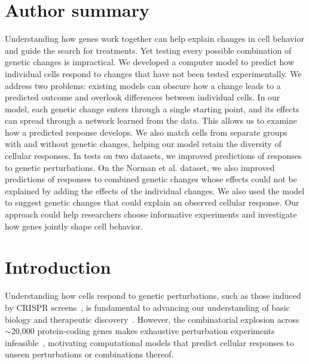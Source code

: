 \documentclass[10pt,letterpaper]{article}
\theoremstyle{definition}
\theoremstyle{remark}
\begin{document}
\section*{Author summary}
Understanding how genes work together can help explain changes in cell behavior and guide the search for treatments.
Yet testing every possible combination of genetic changes is impractical.
We developed a computer model to predict how individual cells respond to changes that have not been tested experimentally.
We address two problems: existing models can obscure how a change leads to a predicted outcome and overlook differences between individual cells.
In our model, each genetic change enters through a single starting point, and its effects can spread through a network learned from the data.
This allows us to examine how a predicted response develops.
We also match cells from separate groups with and without genetic changes, helping our model retain the diversity of cellular responses.
In tests on two datasets, we improved predictions of responses to genetic perturbations.
On the Norman et al. dataset, we also improved predictions of responses to combined genetic changes whose effects could not be explained by adding the effects of the individual changes.
We also used the model to suggest genetic changes that could explain an observed cellular response.
Our approach could help researchers choose informative experiments and investigate how genes jointly shape cell behavior.

\clearpage
{}
\linenumbers


\section*{Introduction}
Understanding how cells respond to genetic perturbations, such as those induced by CRISPR screens~\cite{dixit2016perturb}, is fundamental to advancing our understanding of basic biology and therapeutic discovery~\cite{plenge2013validating,adamson2016multiplexed,norman2019exploring}.
However, the combinatorial explosion across $\sim$20{,}000 protein-coding genes makes exhaustive perturbation experiments infeasible~\cite{norman2019exploring}, motivating computational models that predict cellular responses to unseen perturbations or combinations thereof.
\end{document}
